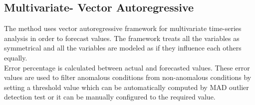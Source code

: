 \subsection{Multivariate- Vector Autoregressive}
The method uses vector autoregressive framework for multivariate time-series analysis in order to forecast values. The framework treats all the variables as symmetrical and all the variables are modeled as if they influence each others equally.
\\
Error percentage is calculated between actual and forecasted values. These error values are used to filter anomalous conditions from non-anomalous conditions by setting a threshold value which can be automatically computed by MAD outlier detection test or it can be manually configured to the required value.
